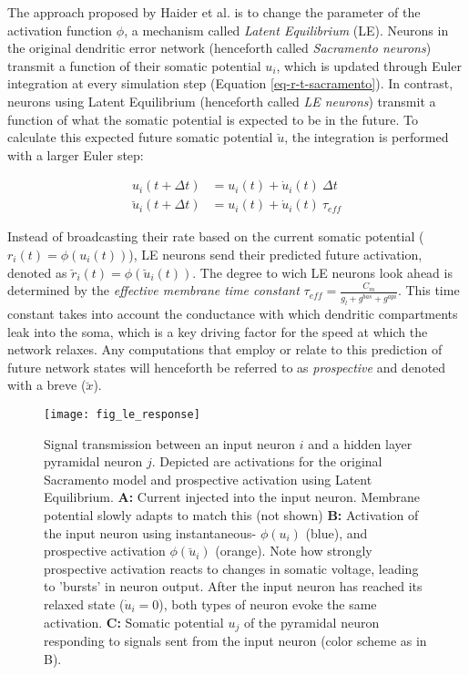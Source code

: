 The approach proposed by Haider et al. is to change the parameter of the activation function $\phi$, a mechanism called
\textit{Latent Equilibrium} (LE). Neurons in the original dendritic error network (henceforth called \textit{Sacramento
neurons}) transmit a function of their somatic potential $u_i$, which is updated through Euler integration at every
simulation step (Equation \ref{eq-r-t-sacramento}). In contrast, neurons using Latent Equilibrium (henceforth called
\textit{LE neurons}) transmit a function of what the somatic potential is expected to be in the future. To calculate
this expected future somatic potential $\breve{u}$, the integration is performed with a larger Euler step:

\begin{align}
  u_i(t+ \Delta t)          & = u_i(t) + \dot{u}_i(t) \ \Delta t \label{eq-r-t-sacramento} \\
  \breve{u}_i(t + \Delta t) & = u_i(t) + \dot{u}_i(t) \ \tau_{eff} \label{eq-r-t-haider}
\end{align}

Instead of broadcasting their rate based on the current somatic potential ($r_i(t) = \phi(u_i(t))$), LE neurons send
their predicted future activation, denoted as $\breve{r}_i(t) = \phi(\breve{u}_i(t))$. The degree to wich LE neurons
look ahead is determined by the \textit{effective membrane time constant} $\tau_{eff} = \frac{C_m}{g_l + g^{bas} +
g^{api}}$. This time constant takes into account the conductance with which dendritic compartments leak into the soma,
which is a key driving factor for the speed at which the network relaxes. Any computations that employ or relate to this
prediction of future network states will henceforth be referred to as \textit{prospective} and denoted with a breve
($\breve{x}$).


\begin{figure}[h]
  \centering
  \texttt{[image: fig\_le\_response]}
  \caption{Signal transmission between an input neuron $i$ and a hidden layer pyramidal neuron $j$. Depicted are
    activations for the original Sacramento model and prospective activation using Latent Equilibrium. \textbf{A:}
    Current injected into the input neuron. Membrane potential slowly adapts to match this (not shown) \textbf{B:}
    Activation of the input neuron using instantaneous- $\phi(u_i)$ (blue), and prospective activation
    $\phi(\breve{u}_i)$ (orange). Note how strongly prospective activation reacts to changes in somatic voltage, leading
    to 'bursts' in neuron output. After the input neuron has reached its relaxed state ($\dot{u}_i = 0$), both types of
    neuron evoke the same activation. \textbf{C:} Somatic potential $u_j$ of the pyramidal neuron responding to signals
    sent from the input neuron (color scheme as in B).}
  \label{fig-comparison-le}
\end{figure}

